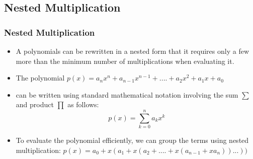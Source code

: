 \documentclass[notheorems,mathserif,table,compress]{beamer}  %
\begin{document}
\subsection{Nested Multiplication}

\begin{frame}
  \frametitle{Nested Multiplication}
  \begin{itemize}
 \item A polynomials can be rewritten in a nested  form  that it  requires  only a few more  than  the minimum  number of multiplications  when  evaluating it.
 \item The polynomial $p(x)=a_nx^n+a_{n-1}x^{n-1}+....+a_2x^2+a_1x+a_0$  
 \item can  be written  using  standard  mathematical  notation involving  the  sum $\sum$ and  product $\prod$ as follows:
 \begin{displaymath}
p(x)=\sum_{k=0}^n a_kx^k 
\end{displaymath}
  \item To evaluate  the  polynomial  efficiently, we can group  the  terms  using  nested  multiplication: $p(x)=a_0+x(a_1+x(a_2+....+x(a_{n-1}+xa_n))...))$
\end{itemize}
\end{frame}

\end{document}
